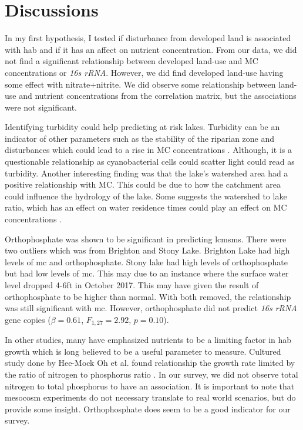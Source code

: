 \section{Discussions}

In my first hypothesis, I tested if disturbance from developed land is associated with \gls{hab} and if it has an affect on nutrient concentration.  From our data, we did not find a significant relationship between developed land-use and MC concentrations or \emph{16s rRNA}. However, we did find developed land-use having some effect with nitrate+nitrite. We did observe some relationship between land-use and nutrient concentrations from the correlation matrix, but the associations were not significant.

Identifying turbidity could help predicting at risk lakes. Turbidity can be an indicator of other parameters such as the stability of the riparian zone and disturbances which could lead to a rise in MC concentrations \cite{taranu_predicting_2017}. Although, it is a questionable relationship as cyanobacterial cells could scatter light could read as turbidity. Another interesting finding was that the lake's watershed area had a positive relationship with MC. This could be due to how the catchment area could influence the hydrology of the lake. Some suggests the watershed to lake ratio, which has an effect on water residence times could play an effect on MC concentrations \cite{taranu_predicting_2017, fraterrigo_influence_2008}. 

Orthophosphate was shown to be significant in predicting \gls{lcmsms}. There were two outliers which was from Brighton and Stony Lake. Brighton Lake had high levels of \gls{mc} and orthophosphate. Stony lake had high levels of orthophosphate but had low levels of \gls{mc}. This may due to an instance where the surface water level dropped 4-6ft in October 2017. This may have given the result of orthophosphate to be higher than normal. With both removed, the relationship was still significant with \gls{mc}. However, orthophosphate did not predict \emph{16s rRNA} gene copies ($\beta=0.61$, $F_{{1,27}}=2.92$, $p=0.10$).

In other studies, many have emphasized nutrients to be a limiting factor in \gls{hab} growth which is long believed to be a useful parameter to measure. Cultured study done by Hee-Mock Oh et al. found relationship the growth rate limited by the ratio of nitrogen to phosphorus ratio \cite{oh_microcystin_2000}. In our survey, we did not observe total nitrogen to total phosphorus to have an association. It is important to note that mesocosm experiments do not necessary translate to real world scenarios, but do provide some insight. Orthophosphate does seem to be a good indicator for our survey. 

